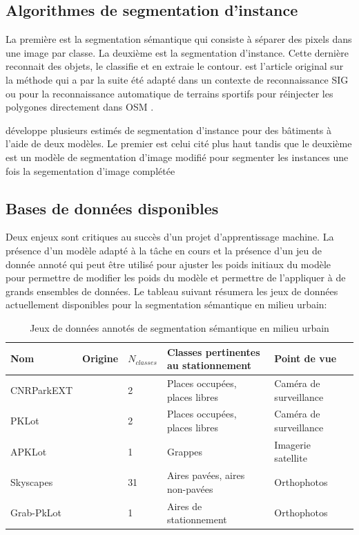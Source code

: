 \subsection{Algorithmes de segmentation d'instance}
La première est la segmentation sémantique qui consiste à séparer des pixels dans une image par classe. La deuxième est la segmentation d'instance. Cette dernière reconnait des objets, le classifie et en extraie le contour. \textcite{He:MaskRCNN:2018} est l'article original sur la méthode qui a par la suite été adapté dans un contexte de reconnaissance SIG \parencite{Pesek:MaskRCNN:2018} ou pour la reconnaissance automatique de terrains sportifs pour réinjecter les polygones directement dans \ac{OSM} \parencite{Remillard:JremillardImagestoosm:2024}.\par
\textcite{Fritz:InstanceSegmentation:2020} développe plusieurs estimés de segmentation d'instance pour des bâtiments à l'aide de deux modèles. Le premier est celui cité plus haut\parencite{He:MaskRCNN:2018} tandis que le deuxième est un modèle de segmentation d'image modifié pour segmenter les instances \parencite{Iglovikov:TernausNetV2Fully:2018} une fois la segementation d'image complétée

\subsection{Bases de données disponibles}
Deux enjeux sont critiques au succès d'un projet d'apprentissage machine. La présence d'un modèle adapté à la tâche en cours et la présence d'un jeu de donnée annoté qui peut être utilisé pour ajuster les poids initiaux du modèle pour permettre de modifier les poids du modèle et permettre de l'appliquer à de grands ensembles de données. Le tableau suivant résumera les jeux de données actuellement disponibles pour la segmentation sémantique en milieu urbain:
\begin{table}
 \centering
    \begin{tabular}{l p{} l p{}  p{} l} 
    \hline
    Nom & Origine & $N_{classes}$ & Classes pertinentes au stationnement & Point de vue\\
    \hline
    CNRParkEXT & \cite{Amato:DeepLearning:2017} & 2 & Places occupées, places libres & Caméra de surveillance \\
    PKLot & \cite{deAlmeida:PKLotRobust:2015} & 2 & Places occupées, places libres & Caméra de surveillance \\
    APKLot & \cite{Hurst-Tarrab:RobustParking:2020} & 1 & Grappes & Imagerie satellite\\
    Skyscapes & \cite{Azimi:SkyScapesFineGrained:2019} & 31 & Aires pavées, aires non-pavées & Orthophotos\\
    Grab-PkLot & \cite{Yin:ContextenrichedSatellite:2022} & 1 & Aires de stationnement & Orthophotos\\
    \hline
   \end{tabular}
   \caption{Jeux de données annotés de segmentation sémantique en milieu urbain}
   \label{tab:jeux_donnees_segmentation_urbain}
\end{table}